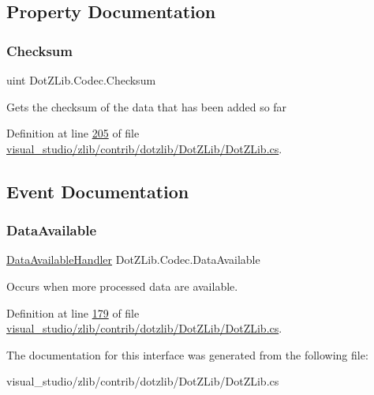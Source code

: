 \subsection{Property Documentation}
\mbox{\label{interface_dot_z_lib_1_1_codec_ab5bdf7dd00f261c89c05a59a9cd7604b}} 
\subsubsection{\texorpdfstring{Checksum}{Checksum}}
{\footnotesize\ttfamily uint Dot\+Z\+Lib.\+Codec.\+Checksum\hspace{0.3cm}{\ttfamily [get]}}



Gets the checksum of the data that has been added so far 



Definition at line \hyperlink{visual__studio_2zlib_2contrib_2dotzlib_2_dot_z_lib_2_dot_z_lib_8cs_source_l00205}{205} of file \hyperlink{visual__studio_2zlib_2contrib_2dotzlib_2_dot_z_lib_2_dot_z_lib_8cs_source}{visual\+\_\+studio/zlib/contrib/dotzlib/\+Dot\+Z\+Lib/\+Dot\+Z\+Lib.\+cs}.



\subsection{Event Documentation}
\mbox{\label{interface_dot_z_lib_1_1_codec_a402ac1b984b22dc3ddae49f7e9e3cc33}} 
\subsubsection{\texorpdfstring{Data\+Available}{DataAvailable}}
{\footnotesize\ttfamily \hyperlink{namespace_dot_z_lib_a13a751b897fc2af0be2307e4deb7eb1c}{Data\+Available\+Handler} Dot\+Z\+Lib.\+Codec.\+Data\+Available}



Occurs when more processed data are available. 



Definition at line \hyperlink{visual__studio_2zlib_2contrib_2dotzlib_2_dot_z_lib_2_dot_z_lib_8cs_source_l00179}{179} of file \hyperlink{visual__studio_2zlib_2contrib_2dotzlib_2_dot_z_lib_2_dot_z_lib_8cs_source}{visual\+\_\+studio/zlib/contrib/dotzlib/\+Dot\+Z\+Lib/\+Dot\+Z\+Lib.\+cs}.



The documentation for this interface was generated from the following file\+:\begin{DoxyCompactItemize}
\item 
visual\+\_\+studio/zlib/contrib/dotzlib/\+Dot\+Z\+Lib/\+Dot\+Z\+Lib.\+cs\end{DoxyCompactItemize}

